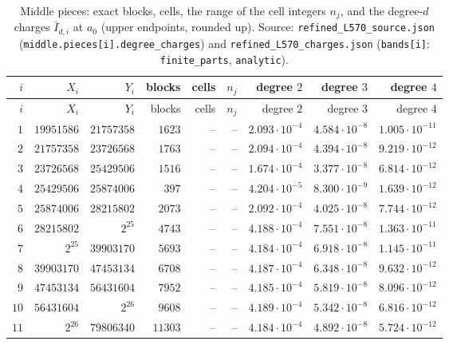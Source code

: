 {\scriptsize\setlength{\tabcolsep}{4pt}\renewcommand{\arraystretch}{0.92}
\begin{longtable}{@{}rrrrrrrrr@{}}
\caption{Middle pieces: exact blocks, cells, the range of the cell integers $n_j$, and the degree-$d$ charges $\bar I_{d,i}$ at $a_0$ (upper endpoints, rounded up). Source: \texttt{refined\_L570\_source.json} (\texttt{middle.pieces[i].degree\_charges}) and \texttt{refined\_L570\_charges.json} (\texttt{bands[i]}: \texttt{finite\_parts}, \texttt{analytic}).}\label{tab:record:middle-pieces}\\
\toprule
$i$ & $X_i$ & $Y_i$ & blocks & cells & $n_j$ & degree $2$ & degree $3$ & degree $4$\\
\midrule
\endfirsthead
\toprule
$i$ & $X_i$ & $Y_i$ & blocks & cells & $n_j$ & degree $2$ & degree $3$ & degree $4$\\
\midrule
\endhead
\bottomrule
\endfoot
$1$ & $19951586$ & $21757358$ & $1623$ & -- & -- & $2.093\cdot10^{-4}$ & $4.584\cdot10^{-8}$ & $1.005\cdot10^{-11}$\\
$2$ & $21757358$ & $23726568$ & $1763$ & -- & -- & $2.094\cdot10^{-4}$ & $4.394\cdot10^{-8}$ & $9.219\cdot10^{-12}$\\
$3$ & $23726568$ & $25429506$ & $1516$ & -- & -- & $1.674\cdot10^{-4}$ & $3.377\cdot10^{-8}$ & $6.814\cdot10^{-12}$\\
$4$ & $25429506$ & $25874006$ & $397$ & -- & -- & $4.204\cdot10^{-5}$ & $8.300\cdot10^{-9}$ & $1.639\cdot10^{-12}$\\
$5$ & $25874006$ & $28215802$ & $2073$ & -- & -- & $2.092\cdot10^{-4}$ & $4.025\cdot10^{-8}$ & $7.744\cdot10^{-12}$\\
$6$ & $28215802$ & $2^{25}$ & $4743$ & -- & -- & $4.188\cdot10^{-4}$ & $7.551\cdot10^{-8}$ & $1.363\cdot10^{-11}$\\
$7$ & $2^{25}$ & $39903170$ & $5693$ & -- & -- & $4.184\cdot10^{-4}$ & $6.918\cdot10^{-8}$ & $1.145\cdot10^{-11}$\\
$8$ & $39903170$ & $47453134$ & $6708$ & -- & -- & $4.187\cdot10^{-4}$ & $6.348\cdot10^{-8}$ & $9.632\cdot10^{-12}$\\
$9$ & $47453134$ & $56431604$ & $7952$ & -- & -- & $4.185\cdot10^{-4}$ & $5.819\cdot10^{-8}$ & $8.096\cdot10^{-12}$\\
$10$ & $56431604$ & $2^{26}$ & $9608$ & -- & -- & $4.189\cdot10^{-4}$ & $5.342\cdot10^{-8}$ & $6.816\cdot10^{-12}$\\
$11$ & $2^{26}$ & $79806340$ & $11303$ & -- & -- & $4.184\cdot10^{-4}$ & $4.892\cdot10^{-8}$ & $5.724\cdot10^{-12}$\\

\end{longtable}}
